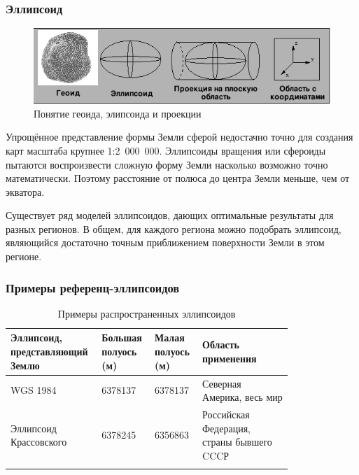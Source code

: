 \begin{frame}
    \frametitle{Эллипсоид}
    \begin{figure}[!ht]
        \begin{center}
            \includegraphics[width=0.8\columnwidth]{./coordinates/img/geoid.png}
        \end{center}
        \caption{Понятие геоида, элипсоида и проекции}
    \end{figure}

    Упрощённое представление формы Земли сферой недостачно точно для создания карт масштаба крупнее 1:2~000~000. Эллипсоиды вращения или сфероиды пытаются воспроизвести сложную форму Земли насколько возможно точно математически. Поэтому расстояние от полюса до центра Земли меньше, чем от экватора.

    Существует ряд моделей эллипсоидов, дающих оптимальные результаты для разных регионов. В общем, для каждого региона можно подобрать эллипсоид, являющийся достаточно точным приближением поверхности Земли в этом регионе.

\end{frame}

\begin{frame}
    \frametitle{Примеры референц-эллипсоидов}
    \begin{table}[h]
    \centering
    \begin{tabular}[c]{p{0.2\linewidth}|p{0.15\linewidth}|p{0.15\linewidth}|p{0.3\linewidth}}
    {Эллипсоид, представ\-ляющий Землю} & Большая полуось (м) & Малая полуось (м) & Область применения\\[2mm]\hline
     WGS 1984 & 6378137 & 6378137 & Северная Америка, весь мир\\
     Эллипсоид Крассовского & 6378245 &6356863 & Российская Федерация, страны бывшего CCCР\\
     & & &
    \end{tabular}\caption{Примеры распространенных эллипсоидов}
    \end{table}
\end{frame}

